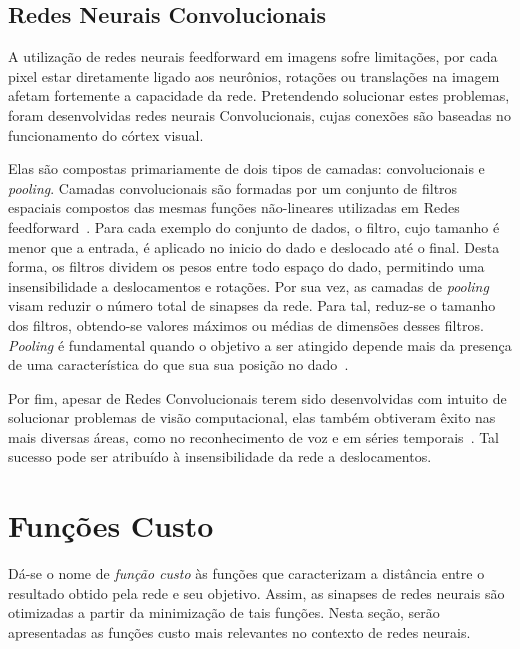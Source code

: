 \subsection{Redes Neurais Convolucionais} \label{sec:convolucionais}

A utilização de redes neurais feedforward em imagens sofre limitações, por cada pixel estar diretamente ligado aos
neurônios, rotações ou translações na imagem afetam fortemente a capacidade da rede.
Pretendendo solucionar estes problemas, foram desenvolvidas redes neurais Convolucionais, cujas conexões são baseadas
no funcionamento do córtex visual.

Elas são compostas primariamente de dois tipos de camadas: convolucionais e \textit{pooling}. Camadas convolucionais são formadas por um conjunto de filtros espaciais compostos das mesmas funções não-lineares utilizadas em Redes feedforward~\cite{goodfellow16}. Para cada exemplo do conjunto de dados, o filtro, cujo tamanho é menor que a entrada, é aplicado no inicio do dado e deslocado até o final. Desta forma, os filtros dividem os pesos entre todo espaço do dado, permitindo uma insensibilidade a deslocamentos e rotações. Por sua vez, as camadas de \textit{pooling} visam reduzir o número total de sinapses da rede. Para tal, reduz-se o tamanho dos filtros, obtendo-se valores máximos ou médias de dimensões desses filtros. \textit{Pooling} é fundamental quando o objetivo a ser atingido depende mais da presença de uma característica do que sua sua posição no dado~\cite{goodfellow16}.

Por fim, apesar de Redes Convolucionais terem sido desenvolvidas com intuito de solucionar problemas de visão computacional, elas também obtiveram êxito nas mais diversas áreas, como no reconhecimento de voz e em séries temporais~\cite{lecun95}. Tal sucesso pode ser atribuído à insensibilidade da rede a deslocamentos.


\section{Funções Custo} \label{sec:custo}

Dá-se o nome de \textit{função custo} às funções que caracterizam a distância entre o resultado obtido pela rede e seu objetivo. Assim, as sinapses de redes neurais são otimizadas a partir da minimização de tais funções. Nesta seção, serão apresentadas as funções custo mais relevantes no contexto de redes neurais.


